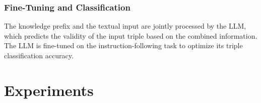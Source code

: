 \documentclass[12pt,a4paper]{article}
\begin{document}
\subsubsection{Fine-Tuning and Classification}

The knowledge prefix and the textual input are jointly processed by the LLM,
which predicts the validity of the input triple based on the combined information.
The LLM is fine-tuned on the instruction-following task to optimize its triple classification accuracy.
%
%


\section{Experiments}\label{sec:experiments}
\end{document}
